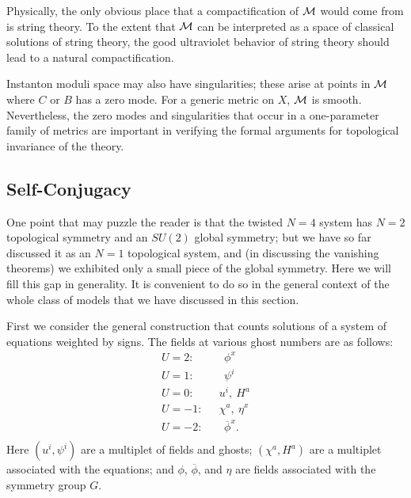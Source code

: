 \documentclass[12pt]{article}
\numberwithin{equation}{section}
\def\bar{\overline}
\begin{document}
Physically, the only obvious place that a compactification of ${\cal M}$
would come from is string theory.  To the extent that ${\cal M}$ can
be interpreted as a space of classical solutions of string theory,
the good ultraviolet behavior of string theory should lead to a natural
compactification.

Instanton moduli space may also have singularities; these arise
at points in ${\cal M}$ where $C$ or $B$ has a zero mode.
For a generic metric on $X$, ${\cal M}$ is smooth.  Nevertheless,
the zero modes and singularities that occur in a one-parameter family
of metrics are important in verifying the formal arguments
for topological invariance of the theory.

\subsection{Self-Conjugacy}

One point that may puzzle the reader is that the twisted $N=4$ system
has $N=2$ topological symmetry and an $SU(2)$ global symmetry;
but we have so far discussed it as an $N=1$ topological system,
and (in discussing the vanishing theorems)
we exhibited only a small piece of the global symmetry.
Here we will fill this gap in generality.  It is convenient
to do so in the general context of the whole class of models that we have
discussed in this section.

First we consider
the general construction that counts solutions of a system of
equations weighted by signs.
The fields at various ghost numbers are as follows:
\begin{equation}
  \label{allthefields}
  \begin{aligned} U=2: &  ~~~~~ \phi^x\\ U=1: & ~~~~~\psi^i   \\ U=0:
    & ~~~u^i,~ H^a \\ U=-1:& ~~~\chi^a, ~\eta^x \\ U=-2: &  ~~~~~\bar\phi^x .\\
  \end{aligned}
\end{equation}
Here $(u^i,\psi^i)$ are a multiplet of fields and ghosts;
$(\chi^a,H^a)$ are a multiplet associated with the equations;
and $\phi$,
$\bar\phi$, and $\eta$ are fields associated with the symmetry group $G$.
\end{document}
